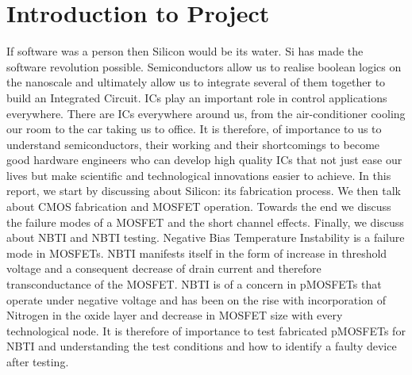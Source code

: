 \chapter{Introduction to Project}

If software was a person then Silicon would be its water. Si has made the software revolution possible. Semiconductors allow us to realise boolean logics on the nanoscale and ultimately allow us to integrate several of them together to build an Integrated Circuit. ICs play an important role in control applications everywhere. There are ICs everywhere around us, from the air-conditioner cooling our room to the car taking us to office. It is therefore, of importance to us to understand semiconductors, their working and their shortcomings to become good hardware engineers who can develop high quality ICs that not just ease our lives but make scientific and technological innovations easier to achieve. In this report, we start by discussing about Silicon: its fabrication process. We then talk about CMOS fabrication and MOSFET operation. Towards the end we discuss the failure modes of a MOSFET and the short channel effects. Finally, we discuss about NBTI and NBTI testing. Negative Bias Temperature Instability is a failure mode in MOSFETs. NBTI manifests itself in the form of increase in threshold voltage and a consequent decrease of drain current and therefore transconductance of the MOSFET. NBTI is of a concern in pMOSFETs that operate under negative voltage and has been on the rise with incorporation of Nitrogen in the oxide layer and decrease in MOSFET size with every technological node. It is therefore of importance to test fabricated pMOSFETs for NBTI and understanding the test conditions and how to identify a faulty device after testing.